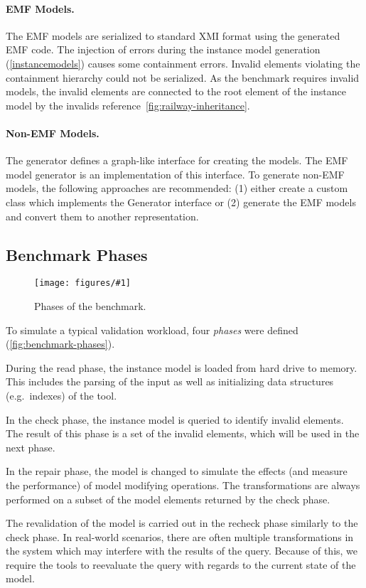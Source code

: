 \documentclass[submission,copyright,creativecommons]{eptcs}
\newcommand{\figref}[1]{\autoref{fig:#1}}
\newcommand{\ttcfig}[2]{
\begin{figure}[htb] 
	\centering
	\texttt{[image: figures/\#1]}
	\caption{#2.}
	\label{fig:#1}
\end{figure}}
\begin{document}
\paragraph{EMF Models.} The EMF models are serialized to standard XMI format using the generated EMF code. The injection of errors during the instance model generation (\autoref{instancemodels}) causes some containment errors. Invalid elements violating the containment hierarchy could not be serialized. As the benchmark requires invalid models, the invalid elements are connected to the root element of the instance model by the \textsf{invalids} reference~\figref{railway-inheritance}.

\paragraph{Non-EMF Models.} The generator defines a graph-like interface for creating the models. The EMF model generator is an implementation of this interface. To generate non-EMF models, the following approaches are recommended: (1) either create a custom class which implements the \textsf{Generator} interface or (2) generate the EMF models and convert them to another representation.

\subsection{Benchmark Phases}
\label{sec:phases}

\ttcfig{benchmark-phases}{Phases of the benchmark}

To simulate a typical validation workload, four \emph{phases} were defined (\figref{benchmark-phases}).

\begin{compactenum}
	\item During the \textsf{read} phase, the instance model is loaded from hard drive to memory. This includes the parsing of the input as well as initializing data structures (e.g.\ indexes) of the tool.
	\item In the \textsf{check} phase, the instance model is queried to identify invalid elements. The result of this phase is a set of the invalid elements, which will be used in the next phase.
	\item In the \textsf{repair} phase, the model is changed to simulate the effects (and measure the performance) of model modifying operations. The transformations are always performed on a subset of the model elements returned by the \textsf{check} phase.
	\item The revalidation of the model is carried out in the \textsf{recheck} phase similarly to the \textsf{check} phase. In real-world scenarios, there are often multiple transformations in the system which may interfere with the results of the query. Because of this, we require the tools to reevaluate the query with regards to the current state of the model.
\end{compactenum}
\end{document}
